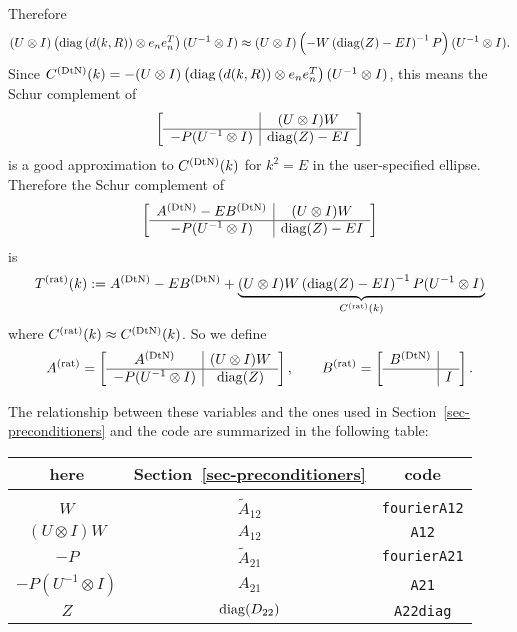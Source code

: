 Therefore
\begin{align*}
 (U \otimes I)
 \left(\operatorname{diag}\left(d(k,R)\right) \otimes e_ne_n^T\right)
 (U^{-1} \otimes I)
 \approx
 (U \otimes I)
 \left(-W\left(\operatorname{diag}(Z) - E I\right)^{-1}P\right)
 (U^{-1} \otimes I).
\end{align*}
Since $C^{(\text{DtN})}(k) = -(U\otimes I)
\left(\operatorname{diag}\left(d(k,R)\right) \otimes e_ne_n^T\right)
(U^{-1}\otimes I)$, this means the Schur complement of
\begin{align*}
 \left[
 \begin{array}{c|c}
                       & (U \otimes I)W \\ \hline
  -P(U^{-1} \otimes I) & \operatorname{diag}(Z) - E I
 \end{array}
 \right]
\end{align*}
is a good approximation to $C^{(\text{DtN})}(k)$ for $k^2 = E$
in the user-specified ellipse. Therefore the Schur
complement of
\begin{align*}
 \left[
 \begin{array}{c|c}
  A^{(\text{DtN})} - EB^{(\text{DtN})}       & (U \otimes I)W \\ \hline
  -P(U^{-1} \otimes I) & \operatorname{diag}(Z) - EI
 \end{array}
 \right]
\end{align*}
is 
\begin{align*}
 T^{(\text{rat})}(k) := 
 A^{(\text{DtN})} - E B^{(\text{DtN})} + 
 \underbrace{
 (U \otimes I)
 W\left(\operatorname{diag}(Z) - EI\right)^{-1} P
 (U^{-1} \otimes I)
 }_{C^{(\text{rat})}(k)}
\end{align*}
where $C^{(\text{rat})}(k) \approx C^{(\text{DtN})}(k)$.
So we define
\begin{align*}
 A^{(\text{rat})}
 = 
 \left[
 \begin{array}{c|c}
  A^{(\text{DtN})}                & (U \otimes I)W \\ \hline
  -P(U^{-1} \otimes I) & \operatorname{diag}(Z) 
 \end{array}
 \right],
 \qquad
 B^{(\text{rat})}
 = 
 \left[
 \begin{array}{c|c}
  B^{(\text{DtN})} &  \\ \hline
        & I
 \end{array}
 \right].
\end{align*}

The relationship between these variables and the ones used in
Section~\ref{sec-preconditioners} and the code are summarized in the
following table:
\begin{center}
\begin{tabular}{c c c}
 here    & Section~\ref{sec-preconditioners} & code \\ \hline \\ 
  $W$                    & $\tilde{A}_{12}$ & {\tt fourierA12} \\ 
  $(U \otimes I)W$       & $A_{12}$         & {\tt A12} \\ 
  $-P$                   & $\tilde{A}_{21}$ & {\tt fourierA21} \\ 
  $-P(U^{-1} \otimes I)$ & $A_{21}$         & {\tt A21} \\ 
  $Z$                    & $\operatorname{diag}(D_{22})$  & {\tt A22diag}
\end{tabular}
\end{center}


